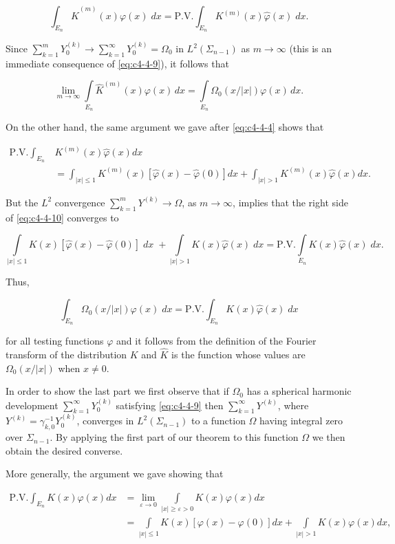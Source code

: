 \[
\int_{E_{n}}\hat{K}^{(m)}(x)\varphi(x)\;d x=\mathrm{P.V.}\int_{E_{n}}K^{(m)}(x)\hat{\varphi}(x)\;d x.
\]

Since $\sum_{k=1}^{m} Y_0^{(k)} \to \sum_{k=1}^{\infty} Y_0^{(k)} = \Omega_0$ in $L^2(\Sigma_{n-1})$ as $m \to \infty$ (this is an immediate consequence of \eqref{eq:c4-4-9}), it follows that

\[
\lim_{m\to\infty}\int\limits_{E_{n}}\hat{K}^{(m)}(x)\varphi(x)\,dx=\int\limits_{E_{n}}\Omega_{0}(x/|x|)\varphi(x)\,dx.
\]

On the other hand, the same argument we gave after \eqref{eq:c4-4-4} shows that

\begin{equation}\label{eq:c4-4-10}
\begin{aligned}\mathrm{P.V.}\int_{E_{n}}&K^{(m)}(x)\hat{\varphi}(x)dx\\&=\int_{|x|\leq1}K^{(m)}(x)[\hat{\varphi}(x)-\hat{\varphi}(0)]dx+\int_{|x|>1}K^{(m)}(x)\hat{\varphi}(x)dx.\end{aligned}
\end{equation}

But the $L^2$ convergence $\sum_{k=1}^m Y^{(k)} \to \Omega$, as $m \to \infty$, implies that the right side of \eqref{eq:c4-4-10} converges to

\[
\int\limits_{|x|\leq1}K(x)[\hat{\varphi}(x)-\hat{\varphi}(0)]\;{d}x\;+\int\limits_{|x|>1}K(x)\hat{\varphi}(x)\;{d}x=\mathrm{P.V.}\int\limits_{E_{n}}K(x)\hat{\varphi}(x)\;{d}x.
\]

Thus,

\[
\int_{E_{n}}\Omega_{0}(x/|x|)\varphi(x)\;d x=\mathrm{P.V.}\int_{E_{n}}K(x)\hat{\varphi}(x)\;d x
\]

for all testing functions $\varphi$ and it follows from the definition of the Fourier transform of the distribution $K$ and $\hat{K}$ is the function whose values are $\Omega_0(x/|x|)$ when $x \neq 0$.

In order to show the last part we first observe that if $\Omega_0$ has a spherical harmonic development $\sum_{k=1}^{\infty} Y_0^{(k)}$ satisfying \eqref{eq:c4-4-9} then $\sum_{k=1}^{\infty} Y^{(k)}$, where $Y^{(k)} = \gamma_{k,0}^{-1} Y_0^{(k)}$, converges in $L^2(\Sigma_{n-1})$ to a function $\Omega$ having integral zero over $\Sigma_{n-1}$. By applying the first part of our theorem to this function $\Omega$ we then obtain the desired converse.

More generally, the argument we gave showing that

\[
\begin{aligned}\mathrm{P.V.}\int_{E_{n}}K(x)\varphi(x)dx&=\lim_{\varepsilon\to0}\int\limits_{|x|\geq\varepsilon>0}K(x)\varphi(x)dx\\&=\int\limits_{|x|\leq1}K(x)[\varphi(x)-\varphi(0)]dx+\int\limits_{|x|>1}K(x)\varphi(x)dx,\end{aligned}
\]

